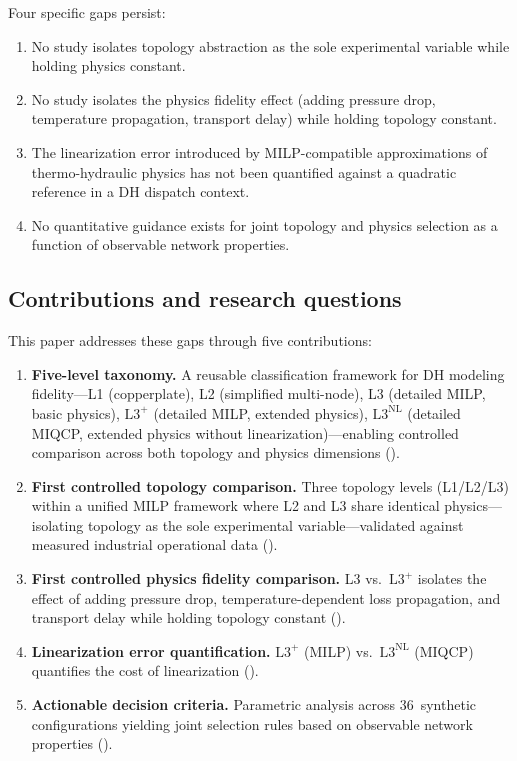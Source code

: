 \documentclass[review,3p]{elsarticle}
\newcommand{\Lplus}{\mathrm{L3}^{+}}
\newcommand{\Lnl}{\mathrm{L3}^{\mathrm{NL}}}
\begin{document}
Four specific gaps persist:
%
\begin{enumerate}[nosep]
  \item No study isolates topology abstraction as the sole
        experimental variable while holding physics constant.
  \item No study isolates the physics fidelity effect (adding
        pressure drop, temperature propagation, transport delay)
        while holding topology constant.
  \item The linearization error introduced by MILP-compatible
        approximations of thermo-hydraulic physics has not been
        quantified against a quadratic reference in a DH dispatch
        context.
  \item No quantitative guidance exists for joint topology and
        physics selection as a function of observable network
        properties.
\end{enumerate}

\subsection{Contributions and research questions}
\label{sec:contributions}

This paper addresses these gaps through five contributions:
%
\begin{enumerate}
  \item \textbf{Five-level taxonomy.} A reusable classification
        framework for DH modeling fidelity---L1 (copperplate), L2
        (simplified multi-node), L3 (detailed MILP, basic physics),
        $\Lplus$ (detailed MILP, extended physics), $\Lnl$ (detailed
        MIQCP, extended physics without linearization)---enabling
        controlled comparison across both topology and physics
        dimensions ().

  \item \textbf{First controlled topology comparison.} Three topology
        levels (L1/L2/L3) within a unified MILP framework where L2
        and L3 share identical physics---isolating topology as the
        sole experimental variable---validated against measured
        industrial operational data ().

  \item \textbf{First controlled physics fidelity comparison.}
        L3 vs.\ $\Lplus$ isolates the effect of adding pressure drop,
        temperature-dependent loss propagation, and transport delay
        while holding topology constant
        ().

  \item \textbf{Linearization error quantification.}
        $\Lplus$ (MILP) vs.\ $\Lnl$ (MIQCP) quantifies the cost of
        linearization ().

  \item \textbf{Actionable decision criteria.} Parametric analysis
        across 36~synthetic configurations yielding joint selection
        rules based on observable network properties
        ().
\end{enumerate}
\end{document}
